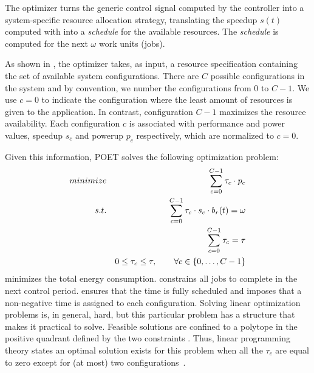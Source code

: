 The optimizer turns the generic control signal computed by the controller into a system-specific resource allocation strategy, translating the speedup $s(t)$ computed with  into a \emph{schedule} for the available resources.
The \emph{schedule} is computed for the next $\omega$ work units (jobs).

As shown in , the optimizer takes, as input, a resource specification containing the set of available system configurations.
There are $C$ possible configurations in the system and by convention, we number the configurations from $0$ to $C-1$.
We use $c = 0$ to indicate the configuration where the least amount of resources is given to the application. %
In contrast, configuration $C-1$ maximizes the resource availability.
Each configuration $c$ is associated with performance and power values, speedup $s_c$ and powerup $p_c$ respectively, which are normalized to $c = 0$.

Given this information, POET solves the following optimization problem:
\begin{eqnarray}
\minimize && \sum_{c=0}^{C-1} \tau_c \cdot p_c \label{eqn:poet-power} \\
\st %
&& \sum_{c=0}^{C-1} \tau_c \cdot s_c \cdot b_r(t) =  \omega \label{eqn:poet-work} \\
&& \sum_{c=0}^{C-1} \tau_c =  \tau \label{eqn:poet-deadline} \\
&& 0 \le \tau_c \le \tau, \qquad \forall c \in \{0,\ldots,C-1\} \label{eqn:poet-time}
\end{eqnarray}
 minimizes the total energy consumption.
 constrains all jobs to complete in the next control period.
 ensures that the time is fully scheduled and  imposes that a non-negative time is assigned to each configuration.
Solving linear optimization problems is, in general, hard, but this particular problem has a structure that makes it practical to solve.
Feasible solutions are confined to a polytope in the positive quadrant defined by the two constraints .
Thus, linear programming theory states an optimal solution exists for this problem when all the $\tau_c$ are equal to zero except for (at most) two configurations~\cite{LP}.

